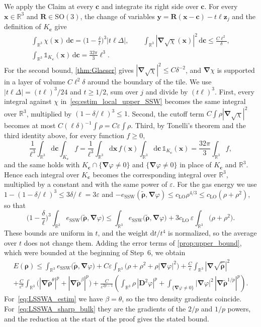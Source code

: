 \documentclass[final,reqno]{amsart}
\theoremstyle{remark}
\renewcommand{\le}{\leqslant}
\renewcommand{\ge}{\geqslant}
\renewcommand{\epsilon}{\varepsilon}
\newcommand{\wt}[1]{\widetilde{#1}}
\newcommand{\RR}{\mathbb{R}}
\newcommand{\SO}{\mathrm{SO}}
\newcommand{\LO}{\mathrm{LO}}
\newcommand{\SSW}{\mathrm{SSW}}
\newcommand{\iden}{\mathbb{1}}
\newcommand{\grad}{\bm{\nabla}}
\newcommand{\tetra}{\mathbb{\Delta}}
\newcommand{\dd}{\mathrm{d}}
\begin{document}
We apply the Claim at every $\mathbf{c}$ and integrate its right side over $\mathbf{c}$. For every $\mathbf{x}\in\RR^3$ and $\mathbf{R}\in\SO(3)$, the change of variables $\mathbf{y}=\mathbf{R}(\mathbf{x}-\mathbf{c})-t\ell\mathbf{z}_j$ and the definition of $K_{\mathbf{c}}$ give
\begin{gather*}
\int_{\RR^3}\chi(\mathbf{x})\,\dd\mathbf{c}=\Big(1-\frac\delta\ell\Big)^3|t\ell\tetra|,\qquad
\int_{\RR^3}|\grad\sqrt\chi(\mathbf{x})|^2\,\dd\mathbf{c}\le\frac{C\ell^2}{\delta},\\
\int_{\RR^3}\iden_{K_{\mathbf{c}}}(\mathbf{x})\,\dd\mathbf{c}=\frac{32\pi}{3}\ell^3.
\end{gather*}
For the second bound, \cref{thm:Glaeser} gives $|\grad\sqrt\chi|^2\le C\delta^{-2}$, and $\grad\chi$ is supported in a layer of volume $C\ell^2\delta$ around the boundary of the tile. We use $|t\ell\tetra|=(t\ell)^3/24$ and $t\ge1/2$, sum over $j$ and divide by $(t\ell)^3$. First, every integral against $\chi$ in~\cref{eq:estim_local_upper_SSW} becomes the same integral over $\RR^3$, multiplied by $(1-\delta/\ell)^3\le1$. Second, the cutoff term $C\int\rho|\grad\sqrt\chi|^2$ becomes at most $C(\ell\delta)^{-1}\int\rho=C\epsilon\int\rho$. Third, by Tonelli's theorem and the third identity above, for every function $f\ge0$,
$$
\frac{1}{\ell^3}\int_{\RR^3}\dd\mathbf{c}\int_{K_{\mathbf{c}}}f=\frac{1}{\ell^3}\int_{\RR^3}\dd\mathbf{x}\,f(\mathbf{x})\int_{\RR^3}\dd\mathbf{c}\,\iden_{K_{\mathbf{c}}}(\mathbf{x})=\frac{32\pi}{3}\int_{\RR^3}f,
$$
and the same holds with $K_{\mathbf{c}}\cap\{\grad\varphi\ne0\}$ and $\{\grad\varphi\ne0\}$ in place of $K_{\mathbf{c}}$ and $\RR^3$. Hence each integral over $K_{\mathbf{c}}$ becomes the corresponding integral over $\RR^3$, multiplied by a constant and with the same power of $\epsilon$. For the gas energy we use $1-(1-\delta/\ell)^3\le3\delta/\ell=3\epsilon$ and $-e_\SSW(\wt{\bm{\rho}},\grad\varphi)\le c_\LO\rho^{4/3}\le c_\LO(\rho+\rho^2)$, so that
$$
\Big(1-\frac\delta\ell\Big)^3\int_{\RR^3}e_\SSW\big(\wt{\bm{\rho}},\grad\varphi\big)\le\int_{\RR^3}e_\SSW\big(\wt{\bm{\rho}},\grad\varphi\big)+3c_\LO\,\epsilon\int_{\RR^3}\big(\rho+\rho^2\big).
$$
These bounds are uniform in $t$, and the weight $\dd t/t^4$ is normalized, so the average over $t$ does not change them. Adding the error terms of \cref{prop:upper_bound}, which were bounded at the beginning of Step~6, we obtain
\begin{multline*}
E(\bm{\rho})\le\int_{\RR^3}e_\SSW\big(\wt{\bm{\rho}},\grad\varphi\big)+C\epsilon\int_{\RR^3}\big(\rho+\rho^2+\rho|\grad\varphi|^2\big)+\frac{C}{\epsilon}\int_{\RR^3}|\grad\sqrt{\wt{\bm{\rho}}}|^2\\
+\frac{C}{\epsilon^b}\int_{\RR^3}\Big(|\grad\wt{\bm{\rho}}^\theta|^p+|\grad\wt{\bm{\rho}}^\beta|^p\Big)
+\frac{C}{\epsilon^{2p-1}}\left(\int_{\RR^3}\rho\,|\mathbf{D}^2\varphi|^p+\int_{\{\grad\varphi\ne0\}}|\grad\varphi|^2\,|\grad\wt{\bm{\rho}}^{1/p}|^p\right).
\end{multline*}
For~\cref{eq:LSSWA_estim} we have $\beta=\theta$, so the two density gradients coincide. For~\cref{eq:LSSWA_sharp_bulk} they are the gradients of the $2/p$ and $1/p$ powers, and the reduction at the start of the proof gives the stated bound.
\end{document}
